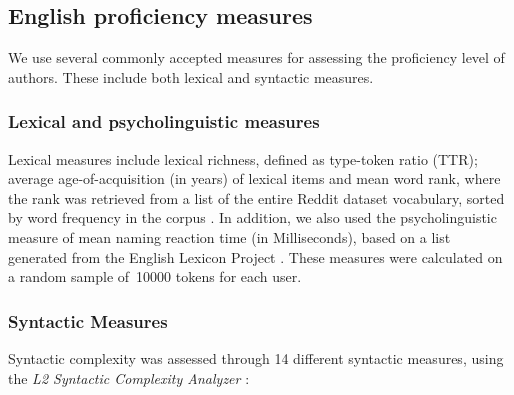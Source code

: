 \documentclass[11pt]{article}
\newcommand{\note}[1]{\textit{\small\color{magenta}{#1}}}
\begin{document}
\subsection{English proficiency measures}

We use several commonly accepted measures for assessing the proficiency level of authors. These include both lexical and syntactic measures.

\subsubsection{Lexical and psycholinguistic measures}

Lexical measures include lexical richness, defined as type-token ratio (TTR); average age-of-acquisition (in years) of lexical items \citep{Kuperman2012} and mean word rank, where the rank was retrieved from a list of the entire Reddit dataset vocabulary, sorted by word frequency in the corpus \citep{TACL1403}.  In addition, we also used the psycholinguistic measure of mean naming reaction time (in Milliseconds), based on a list generated from the English Lexicon Project \citep{Balota2007}. These measures were calculated on a random sample of~10000 tokens for each user.


\subsubsection{Syntactic Measures }

Syntactic complexity was assessed through 14 different syntactic measures, using the \emph{L2 Syntactic Complexity Analyzer} \citep{Lu2010-Automatic}: \note{leave only the ones you end up using}
\end{document}
